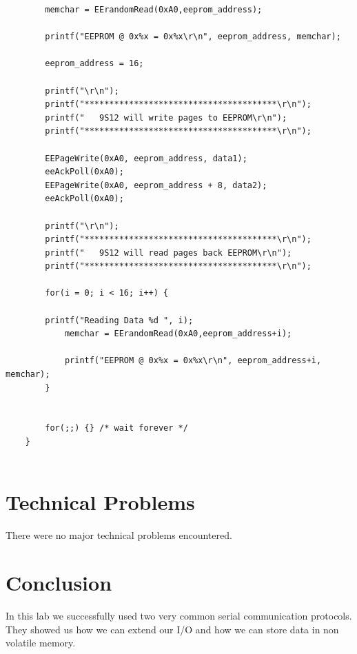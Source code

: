 \documentclass{article}
\begin{document}
\begin{lstlisting}
		memchar = EErandomRead(0xA0,eeprom_address);
		
		printf("EEPROM @ 0x%x = 0x%x\r\n", eeprom_address, memchar);
		
		eeprom_address = 16; 
		
		printf("\r\n");    
		printf("***************************************\r\n");
		printf("   9S12 will write pages to EEPROM\r\n");
		printf("***************************************\r\n");
		
		EEPageWrite(0xA0, eeprom_address, data1);
		eeAckPoll(0xA0);
		EEPageWrite(0xA0, eeprom_address + 8, data2);
		eeAckPoll(0xA0);
		
		printf("\r\n");    
		printf("***************************************\r\n");
		printf("   9S12 will read pages back EEPROM\r\n");
		printf("***************************************\r\n");
	
		for(i = 0; i < 16; i++) {
	
		printf("Reading Data %d ", i);
			memchar = EErandomRead(0xA0,eeprom_address+i);
	
			printf("EEPROM @ 0x%x = 0x%x\r\n", eeprom_address+i, 	memchar);
		}
	
	
		for(;;) {} /* wait forever */
	}
	
	\end{lstlisting}
	
	\section*{Technical Problems}
	There were no major technical problems encountered.
	\section*{Conclusion}
	In this lab we successfully used two very common serial communication protocols. They showed us how we can extend our I/O and how we can store data in non volatile memory.
\end{document}
